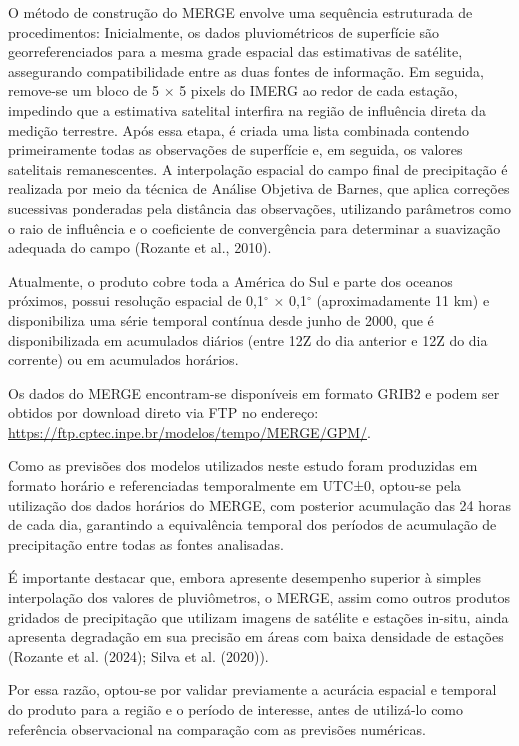 \documentclass[12pt,a4paper,oneside]{book}
\begin{document}
O método de construção do MERGE envolve uma sequência estruturada de procedimentos: Inicialmente, os dados pluviométricos de superfície são georreferenciados para a mesma grade espacial das estimativas de satélite, assegurando compatibilidade entre as duas fontes de informação. Em seguida, remove-se um bloco de 5 $\times$ 5 pixels do IMERG ao redor de cada estação, impedindo que a estimativa satelital interfira na região de influência direta da medição terrestre. Após essa etapa, é criada uma lista combinada contendo primeiramente todas as observações de superfície e, em seguida, os valores satelitais remanescentes. A interpolação espacial do campo final de precipitação é realizada por meio da técnica de Análise Objetiva de Barnes, que aplica correções sucessivas ponderadas pela distância das observações, utilizando parâmetros como o raio de influência e o coeficiente de convergência para determinar a suavização adequada do campo (Rozante et al., 2010).

Atualmente, o produto cobre toda a América do Sul e parte dos oceanos próximos, possui resolução espacial de 0,1$^\circ$ $\times$ 0,1$^\circ$ (aproximadamente 11 km) e disponibiliza uma série temporal contínua desde junho de 2000, que é disponibilizada em acumulados diários (entre 12Z do dia anterior e 12Z do dia corrente) ou em acumulados horários.

Os dados do MERGE encontram-se disponíveis em formato GRIB2 e podem ser obtidos por download direto via FTP no endereço: \textcolor{red}{\url{https://ftp.cptec.inpe.br/modelos/tempo/MERGE/GPM/}}.

Como as previsões dos modelos utilizados neste estudo foram produzidas em formato horário e referenciadas temporalmente em UTC±0, optou-se pela utilização dos dados horários do MERGE, com posterior acumulação das 24 horas de cada dia, garantindo a equivalência temporal dos períodos de acumulação de precipitação entre todas as fontes analisadas.

É importante destacar que, embora apresente desempenho superior à simples interpolação dos valores de pluviômetros, o MERGE, assim como outros produtos gridados de precipitação que utilizam imagens de satélite e estações in-situ, ainda apresenta degradação em sua precisão em áreas com baixa densidade de estações (Rozante et al. (2024); Silva et al. (2020)).

Por essa razão, optou-se por validar previamente a acurácia espacial e temporal do produto para a região e o período de interesse, antes de utilizá-lo como referência observacional na comparação com as previsões numéricas.
\end{document}
